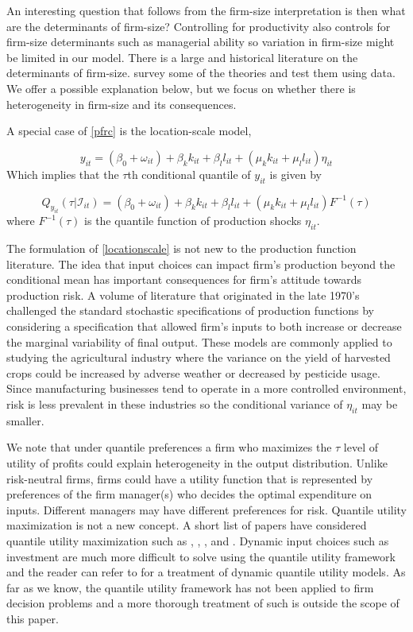 \documentclass[11pt]{article}
\begin{document}
 An interesting question that follows from the firm-size interpretation is then what are the determinants of firm-size? Controlling for productivity also controls for firm-size determinants such as managerial ability so variation in firm-size might be limited in our model. There is a large and historical literature on the determinants of firm-size. \cite{Kumar1999} survey some of the theories and test them using data. We offer a possible explanation below, but we focus on whether there is heterogeneity in firm-size and its consequences. 

A special case of \eqref{pfrc} is the location-scale model,

\begin{equation} \label{locationscale}
    y_{it}=(\beta_{0}+\omega_{it})+\beta_{k}k_{it}+\beta_{l}l_{it}+(\mu_{k}k_{it}+\mu_{l}l_{it})\eta_{it}
\end{equation}
Which implies that the $\tau$th conditional quantile of $y_{it}$ is given by

\begin{equation}
Q_{y_{it}}(\tau|\mathcal{I}_{it})=(\beta_{0}+\omega_{it})+\beta_{k}k_{it}+\beta_{l}l_{it}+(\mu_{k}k_{it}+\mu_{l}l_{it})F^{-1}(\tau)
\end{equation}
where $F^{-1}(\tau)$ is the quantile function of production shocks $\eta_{it}$.

The formulation of \eqref{locationscale} is not new to the production function literature. The idea that input choices can impact firm's production beyond the conditional mean has important consequences for firm's attitude towards production risk. A volume of literature that originated in the late 1970's challenged the standard stochastic specifications of production functions \citep{Just1978,Just1979} by considering a specification that allowed firm's inputs to both increase or decrease the marginal variability of final output. These models are commonly applied to studying the agricultural industry where the variance on the yield of harvested crops could be increased by adverse weather or decreased by pesticide usage. Since manufacturing businesses tend to operate in a more controlled environment, risk is less prevalent in these industries so the conditional variance of $\eta_{it}$ may be smaller.

We note that under quantile preferences a firm who maximizes the $\tau$ level of utility of profits could explain heterogeneity in the output distribution. Unlike risk-neutral firms, firms could have a utility function that is represented by preferences of the firm manager(s) who decides the optimal expenditure on inputs. Different managers may have different preferences for risk. Quantile utility maximization is not a new concept. A short list of papers have considered quantile utility maximization such as \cite{Manski1988}, \cite{ROSTEK2009}, \cite{Chambers2007}, and \cite{Bhattacharya2009}. Dynamic input choices such as investment are much more difficult to solve using the quantile utility framework and the reader can refer to \cite{Castro2017} for a treatment of dynamic quantile utility models. As far as we know, the quantile utility framework has not been applied to firm decision problems and a more thorough treatment of such is outside the scope of this paper.
\end{document}
